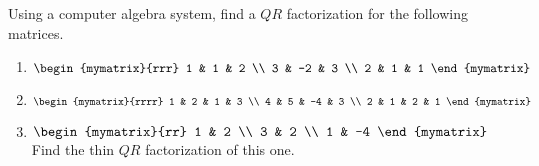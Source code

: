 \begin{ex} Using a computer algebra system, find a $QR$ factorization for the
following matrices.

\begin{enumerate}
\item $\begin{mymatrix}{rrr}
1 & 1 & 2 \\ 
3 & -2 & 3 \\ 
2 & 1 & 1
\end{mymatrix} \ $

\item $\begin{mymatrix}{rrrr}
1 & 2 & 1 & 3 \\ 
4 & 5 & -4 & 3 \\ 
2 & 1 & 2 & 1
\end{mymatrix} \ $

\item $\begin{mymatrix}{rr}
1 & 2 \\ 
3 & 2 \\ 
1 & -4
\end{mymatrix} \allowbreak $ Find the thin $QR$ factorization of this one.
\end{enumerate}
\end{ex}

